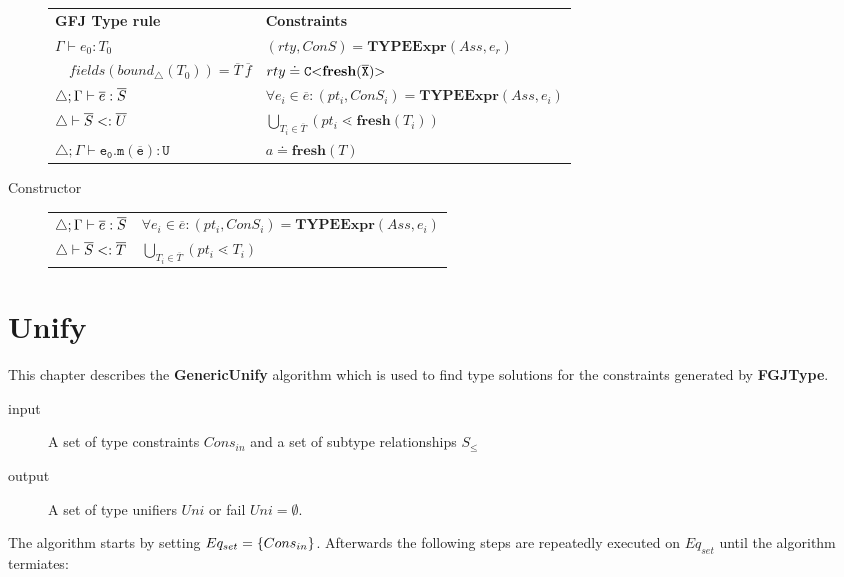 \documentclass[acmsmall,screen,review]{acmart}
\begin{document}
\begin{description}
 \begin{tabular}{l|l}
   \textbf{GFJ Type rule} & \textbf{Constraints} \\
   $\Gamma \vdash e_0:T_0$ & $(rty, ConS) = \textbf{TYPEExpr}(Ass, e_r)$\\ 
   $\quad \mathit{fields}(\mathit{bound}_\triangle(T_0)) = \overline{T} \ \overline{f}$ & $rty \doteq \mathtt{C {\tt <} \textbf{fresh}(\overline{X}) {\tt >} \ }$ \\
  $\triangle; \Gamma \vdash \overline{e} : \overline{S}$ & $\forall e_i \in \overline{e} : (pt_i, ConS_i) = \textbf{TYPEExpr}(Ass, e_i)$\\
  $\triangle \vdash \overline{S} <: \overline{U}$ & $ \bigcup_{T_i \in \overline{T}} (pt_i \lessdot \textbf{fresh}(T_i))$\\
  $\triangle; \Gamma \vdash \mathtt{e_0.m(\overline{e}) : U }$ & $a \doteq \textbf{fresh}(T)$ \\
 \end{tabular}
 \item[Constructor]

\begin{tabular}{l|l}
  $\triangle; \Gamma \vdash \overline{e} : \overline{S}$ & $\forall e_i \in \overline{e} : (pt_i, ConS_i) = \textbf{TYPEExpr}(Ass, e_i)$\\
  $\triangle \vdash \overline{S} <: \overline{T}$ & $\bigcup_{T_i \in \overline{T}} (pt_i \lessdot T_i)$
\end{tabular}
  
\end{description}

\section{Unify}
This chapter describes the \textbf{GenericUnify} algorithm
which is used to find type solutions for the constraints generated by \textbf{FGJType}.

\begin{description}
\item[input] A set of type constraints $Cons_{in}$ and a set of subtype relationships $S_\leq$
\item[output] A set of type unifiers $Uni$
or fail $Uni = \emptyset$.
\end{description}

The algorithm starts by setting $Eq_{set} = \{  Cons_{in}  \}$.
Afterwards the following steps are repeatedly executed on $Eq_{set}$ until the algorithm termiates:
\end{document}
